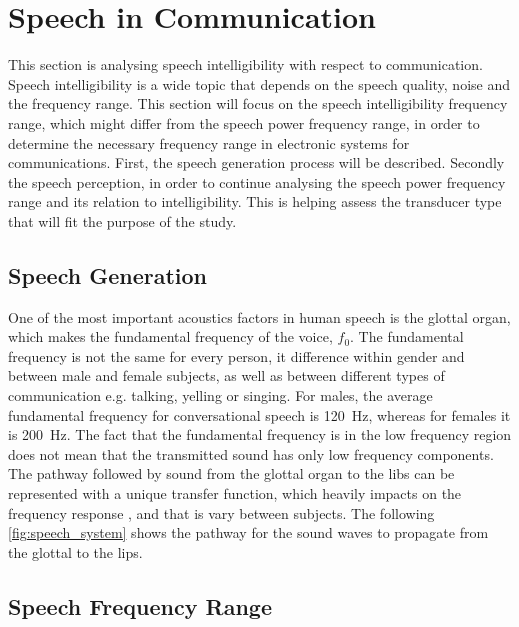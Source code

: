 \section{Speech in Communication}
\label{speech_in_comm}

This section is analysing speech intelligibility with respect to communication. Speech intelligibility is a wide topic that depends on the speech quality, noise and the frequency range. This section will focus on the speech intelligibility frequency range, which might differ from the speech power frequency range, in order to determine the necessary frequency range in electronic systems for communications. First, the speech generation process will be described. Secondly the speech perception, in order to continue analysing the speech power frequency range and its relation to intelligibility. This is helping assess the transducer type that will fit the purpose of the study.

\subsection{Speech Generation}

One of the most important acoustics factors in human speech is the glottal organ, which makes the fundamental frequency of the voice, $f_0$. The fundamental frequency is not the same for every person, it difference within gender and between male and female subjects, as well as between different types of communication e.g. talking, yelling or singing. For males, the average fundamental frequency for conversational speech is \SI{120}{\hertz}, whereas for females it is \SI{200}{\hertz}. The fact that the fundamental frequency is in the low frequency region does not mean that the transmitted sound has only low frequency components. The pathway followed by sound from the glottal organ to the libs can be represented with a unique transfer function, which heavily impacts on the frequency response \citep{pulkki2015}, and that is vary between subjects. The following \autoref{fig:speech_system} shows the pathway for the sound waves to propagate from the glottal to the lips.



\subsection{Speech Frequency Range}

